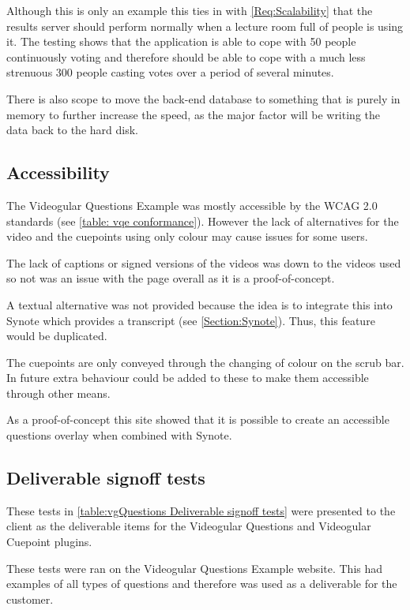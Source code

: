 Although this is only an example this ties in with \cref{Req:Scalability} that the results server should perform normally when a lecture room full of people is using it. The testing shows that the application is able to cope with 50 people continuously voting and therefore should be able to cope with a much less strenuous 300 people casting votes over a period of several minutes.

There is also scope to move the back-end database to something that is purely in memory to further increase the speed, as the major factor will be writing the data back to the hard disk.

\subsection{Accessibility}
\label{Subsection: vqe accessibility}

The \gls{Videogular} Questions Example was mostly accessible by the WCAG 2.0 standards (see \autoref{table: vqe conformance}). However the lack of alternatives for the video and the cuepoints using only colour may cause issues for some users.

The lack of captions or signed versions of the videos was down to the videos used so not was an issue with the page overall as it is a proof-of-concept.

A textual alternative was not provided because the idea is to integrate this into Synote which provides a transcript (see \autoref{Section:Synote}). Thus, this feature would be duplicated.

The cuepoints are only conveyed through the changing of colour on the scrub bar. In future extra behaviour could be added to these to make them accessible through other means.

As a proof-of-concept this site showed that it is possible to create an accessible questions overlay when combined with Synote.

\subsection{Deliverable signoff tests}

These tests in \autoref{table:vgQuestions Deliverable signoff tests} were presented to the client as the deliverable items for the Videogular Questions and Videogular Cuepoint plugins.

These tests were ran on the Videogular Questions Example website. This had examples of all types of questions and therefore was used as a deliverable for the customer.

